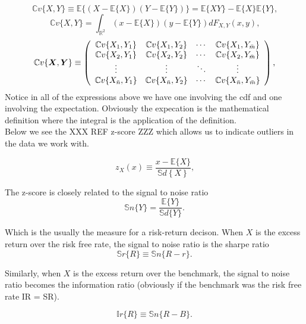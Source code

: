 \documentclass{article}
\theoremstyle{definition}
\theoremstyle{remark}
\begin{document}
\[
    \mathbb{C}v\{X,Y\}\equiv\mathbb{E}\{(X-\mathbb{E}\{X\})(Y-\mathbb{E}\{Y\})\}=\mathbb{E}\{XY\}-\mathbb{E}\{X\}\mathbb{E}\{Y\}\text{,}
\]
\[
\mathbb{C}v\{X,Y\}=\int\nolimits_{\mathbb{R}^{2}}(x-\mathbb{E}\{X\})(y-\mathbb{E}\{Y\})dF_{X,Y}(x,y)\text{,}
\]
\[
    \mathbb{C}v\{\boldsymbol{X},\boldsymbol{Y}\}\equiv\left( \begin{array}
        [c]{cccc}\mathbb{C}v\{X_{1},Y_{1}\} & \mathbb{C}v\{X_{1},Y_{2}\} & \cdots & \mathbb{C}v\{X_{1},Y_{\bar{m}}\}\\
        \mathbb{C}v\{X_{2},Y_{1}\} & \mathbb{C}v\{X_{2},Y_{2}\} & \cdots & \mathbb{C}v\{X_{2},Y_{\bar{m}}\}\\
        \vdots & \vdots & \ddots & \vdots\\
        \mathbb{C}v\{X_{\bar{n}},Y_{1}\} & \mathbb{C}v\{X_{\bar{n}},Y_{2}\} & \cdots & \mathbb{C}v\{X_{\bar{n}},Y_{\bar{m}}\}
        \end{array} \right) \text{,}
\]
Notice in all of the expressions above we have one involving the cdf and one involving 
the expectation. Obviously the expecation is the mathematical definition where the integral is the application
of the definition. \\
Below we see the XXX REF z-score ZZZ which allows us to
indicate outliers in the data we work with.

\begin{equation}
    z_{X}(x)\equiv\dfrac{x-\mathbb{E}\{X\}}{\mathbb{S}\mathit{d}\left\{ X\right\} }\text{,}
    \end{equation}

The z-score is closely related to the signal to noise ratio 
\begin{equation}
    \mathbb{S}\mathit{n}\{Y\}=\frac{\mathbb{E}\{Y\}}{\mathbb{S}\mathit{d}\{Y\}}\text{.}
\end{equation}

Which is the usually the measure for a risk-return decison. When $X$ is the 
excess return over the risk free rate, the signal to noise ratio is the sharpe ratio
\begin{equation}
    \mathbb{S}\mathit{r}\{R\}\equiv\mathbb{S}\mathit{n}\{R-r\}\text{.}
    \end{equation}



Similarly, when $X$ is the excess return over the benchmark, 
the signal to noise ratio becomes the information ratio (obviously if the benchmark was the risk free rate IR = SR).

\begin{equation}
    \mathbb{I}\mathit{r}\{R\}\equiv\mathbb{S}\mathit{n}\{R-B\}\text{.}
    \end{equation}
\end{document}
